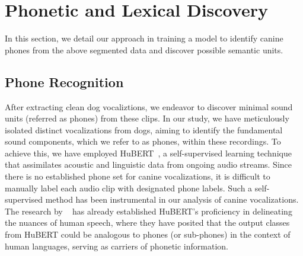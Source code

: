 \section{Phonetic and Lexical Discovery}
In this section, we detail our approach in training a model to identify canine phones from the above segmented data and discover possible semantic units.
\subsection{Phone Recognition}


After extracting clean dog vocaliztions, we endeavor to discover minimal sound units (referred as phones) from these clips. 
In our study, we have meticulously isolated distinct vocalizations from dogs, aiming to identify the fundamental sound components, which we refer to as phones, within these recordings. To achieve this, we have employed HuBERT~\citep{hsu2021hubert}, a self-supervised learning technique that assimilates acoustic and linguistic data from ongoing audio streams. Since there is no established phone set for canine vocalizations, it is difficult to manually label each audio clip with designated phone labels. Such a self-supervised method has been instrumental in our analysis of canine vocalizations. The research by ~ has already established HuBERT's proficiency in delineating the nuances of human speech, where they have posited that the output classes from HuBERT could be analogous to phones (or sub-phones) in the context of human languages, serving as carriers of phonetic information.


